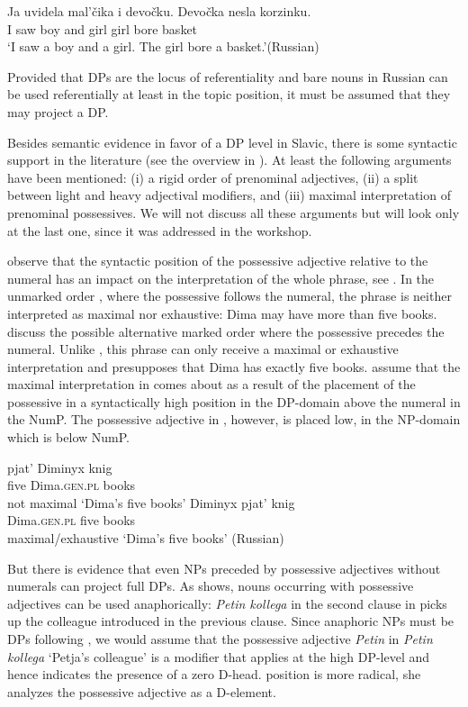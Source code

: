 \documentclass[output=paper,
colorlinks,
citecolor=brown,
newtxmath
]{langscibook}
\begin{document}
\ea \label{ex:2}
\gll Ja uvidela mal'čika i devočku. Devočka nesla korzinku. \\
    I saw boy and girl girl bore basket\\
\glt `I saw a boy and a girl. The girl bore a basket.'\hfill (Russian)
\z

\noindent Provided that DPs are the locus of referentiality and bare nouns in Russian can be used referentially at least in the topic position, it must be assumed that they may project a DP.

Besides semantic evidence in favor of a DP level in Slavic, there is some syntactic support in the literature (see the overview in \citealt{Pereltsvaig2013}). At least the following arguments have been mentioned: (i) a rigid order of prenominal adjectives, (ii) a split between light and heavy adjectival modifiers, and (iii) maximal interpretation of prenominal possessives. We will not discuss all these arguments but will look only at the last one, since it was addressed in the workshop.

\cite{Kagan.Pereltsvaig2014} observe that the syntactic position of the possessive adjective relative to the numeral has an impact on the interpretation of the whole phrase, see . In the unmarked order , where the possessive follows the numeral, the phrase is neither interpreted as maximal nor exhaustive: Dima may have more than five books. \cite{Kagan.Pereltsvaig2014} discuss the possible alternative marked order  where the possessive precedes the numeral. Unlike , this phrase can only receive a maximal or exhaustive interpretation and presupposes that Dima has exactly five books. \cite{Kagan.Pereltsvaig2014} assume that the maximal interpretation in  comes about as a result of the placement of the possessive in a syntactically high position in the DP-domain above the numeral in the NumP. The possessive adjective in , however, is placed low, in the NP-domain which is below NumP.

\ea \label{ex:3}
\ea
\gll pjat' Diminyx knig \\
    five Dima.\textsc{gen.pl} books\\ \hfill not maximal
\glt `Dima’s five books' \label{ex:3a}
\ex \gll Diminyx pjat' knig \\
 Dima.\textsc{gen.pl} five books\\ \hfill maximal/exhaustive
\glt `Dima's five books' \hfill (Russian) \label{ex:3b}
\z \z

\noindent But there is evidence that even NPs preceded by possessive adjectives without numerals can project full DPs. As  shows, nouns occurring with possessive adjectives can be used anaphorically: \textit{Petin kollega} in the second clause in  picks up the colleague introduced in the previous clause. Since anaphoric NPs must be DPs following \citet{Kagan.Pereltsvaig2014}, we would assume that the possessive adjective \textit{Petin} in \textit{Petin kollega} `Petja's colleague' is a modifier that applies at the high DP-level and hence indicates the presence of a zero D-head.  position is more radical, she analyzes the possessive adjective as a D-element.
\end{document}
